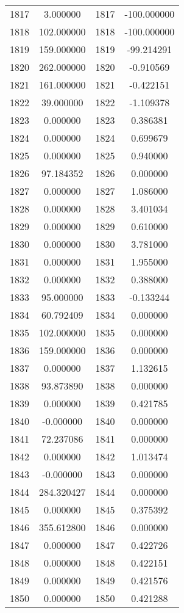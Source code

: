 \documentclass[12pt]{article}
\begin{document}
\begin{longtable}{@{}cccc@{}}
1817 & 3.000000 & 1817 & -100.000000 \\
1818 & 102.000000 & 1818 & -100.000000 \\
1819 & 159.000000 & 1819 & -99.214291 \\
1820 & 262.000000 & 1820 & -0.910569 \\
1821 & 161.000000 & 1821 & -0.422151 \\
1822 & 39.000000 & 1822 & -1.109378 \\
1823 & 0.000000 & 1823 & 0.386381 \\
1824 & 0.000000 & 1824 & 0.699679 \\
1825 & 0.000000 & 1825 & 0.940000 \\
1826 & 97.184352 & 1826 & 0.000000 \\
1827 & 0.000000 & 1827 & 1.086000 \\
1828 & 0.000000 & 1828 & 3.401034 \\
1829 & 0.000000 & 1829 & 0.610000 \\
1830 & 0.000000 & 1830 & 3.781000 \\
1831 & 0.000000 & 1831 & 1.955000 \\
1832 & 0.000000 & 1832 & 0.388000 \\
1833 & 95.000000 & 1833 & -0.133244 \\
1834 & 60.792409 & 1834 & 0.000000 \\
1835 & 102.000000 & 1835 & 0.000000 \\
1836 & 159.000000 & 1836 & 0.000000 \\
1837 & 0.000000 & 1837 & 1.132615 \\
1838 & 93.873890 & 1838 & 0.000000 \\
1839 & 0.000000 & 1839 & 0.421785 \\
1840 & -0.000000 & 1840 & 0.000000 \\
1841 & 72.237086 & 1841 & 0.000000 \\
1842 & 0.000000 & 1842 & 1.013474 \\
1843 & -0.000000 & 1843 & 0.000000 \\
1844 & 284.320427 & 1844 & 0.000000 \\
1845 & 0.000000 & 1845 & 0.375392 \\
1846 & 355.612800 & 1846 & 0.000000 \\
1847 & 0.000000 & 1847 & 0.422726 \\
1848 & 0.000000 & 1848 & 0.422151 \\
1849 & 0.000000 & 1849 & 0.421576 \\
1850 & 0.000000 & 1850 & 0.421288 \\

\end{longtable}
\end{document}
